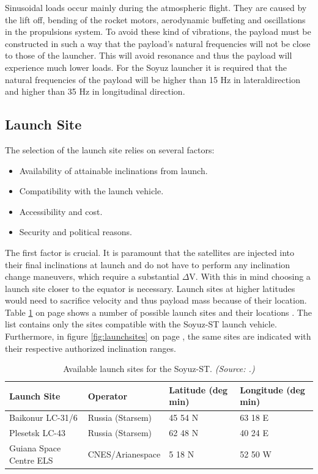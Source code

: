 Sinusoidal loads occur mainly during the atmospheric flight. They are caused by the lift off, bending of the rocket motors, aerodynamic buffeting and oscillations in the propulsions system. To avoid these kind of vibrations, the payload must be constructed in such a way that the payload's natural frequencies will not be close to those of the launcher. This will avoid resonance and thus the payload will experience much lower loads. For the Soyuz launcher it is required that the natural frequencies of the payload will be higher than 15 Hz in lateraldirection and higher than 35 Hz in longitudinal direction.  

\subsection{Launch Site}
\label{frLSLS}

The selection of the launch site relies on several factors:

\begin{itemize}
	\item Availability of attainable inclinations from launch.
	\item Compatibility with the launch vehicle.
	\item Accessibility and cost.
	\item Security and political reasons. 
\end{itemize}

The first factor is crucial. It is paramount that the satellites are injected into their final inclinations at launch and do not have to perform any inclination change maneuvers, which require a substantial $\Delta$V. With this in mind choosing a launch site closer to the equator is necessary. Launch sites at higher latitudes would need to sacrifice velocity and thus payload mass because of their location. Table \ref{table:launchtable} on page \pageref{table:launchtable} shows a number of possible launch sites and their locations \cite{larson}. The list contains only the sites compatible with the Soyuz-ST launch vehicle. Furthermore, in figure \ref{fig:launchsites} on page \pageref{fig:launchsites}, the same sites are indicated with their respective authorized inclination ranges.

\begin{table}[!h]
\begin{centering}
\begin{tabular}{llp{2cm}p{2cm}}
\toprule
Launch Site & Operator & Latitude (deg min) & Longitude (deg min) \\
\hline \hline
Baikonur LC-31/6  & Russia (Starsem) & 45 54 N & 63 18 E \\
Plesetsk LC-43  & Russia (Starsem)   &  62 48 N & 40 24 E \\
Guiana Space Centre  ELS  & CNES/Arianespace  & 5 18 N & 52 50 W \\
\bottomrule
\end{tabular}
\caption{Available launch sites for the Soyuz-ST. \emph{(Source: \cite{larson}.)}}
\label{table:launchtable}
\end{centering}
\end{table}  

